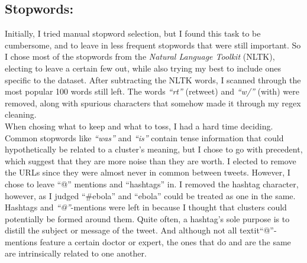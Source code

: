 \documentclass[fleqn]{article}
\begin{document}
\subsection{Stopwords:}
Initially, I tried manual stopword selection, but I found this task to be cumbersome, and to leave in less frequent stopwords that were still important.  So I chose most of the stopwords from the \textit{Natural Language Toolkit }(NLTK), electing to leave a certain few out, while also trying my best to include ones specific to the dataset.  After subtracting the NLTK words, I scanned through the most popular 100 words still left.  The words \textit{``rt''} (retweet) and \textit{``w/''} (with) were removed, along with spurious characters that somehow made it through my regex cleaning.\\
\newline
When chosing what to keep and what to toss, I had a hard time deciding.  Common stopwords like \textit{``was''} and \textit{``is''} contain tense information that could hypothetically be related to a cluster's meaning, but I chose to go with precedent, which suggest that they are more noise than they are worth.  I elected to remove the URLs since they were almost never in common between tweets.  However, I chose to leave ``@'' mentions and ``hashtags'' in.  I removed the hashtag character, however, as I judged ``\#ebola'' and ``ebola'' could be treated as one in the same. Hashtags and \textit{``@''}-mentions were left in because I thought that clusters could potentially be formed around them.  Quite often, a hashtag's sole purpose is to distill the subject or message of the tweet.  And although not all textit{``@''}-mentions feature a certain doctor or expert, the ones that do and are the same are intrinsically related to one another.
\end{document}
